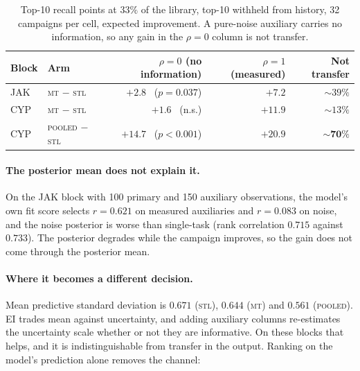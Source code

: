 \documentclass[11pt]{article}
\newcommand{\stl}{\textsc{stl}}
\newcommand{\mt}{\textsc{mt}}
\newcommand{\pooled}{\textsc{pooled}}
\begin{document}
\begin{table}[ht]
\centering\small
\begin{tabular}{llrrr}
\toprule
Block & Arm & $\rho = 0$ (no information) & $\rho = 1$ (measured) & Not transfer \\
\midrule
JAK & \mt{} $-$ \stl{}     & $+2.8$ \ ($p = 0.037$) & $+7.2$  & ${\sim}39\%$ \\
CYP & \mt{} $-$ \stl{}     & $+1.6$ \ (n.s.)        & $+11.9$ & ${\sim}13\%$ \\
CYP & \pooled{} $-$ \stl{} & $\mathbf{+14.7}$ \ ($p < 0.001$) & $+20.9$ & $\mathbf{{\sim}70\%}$ \\
\bottomrule
\end{tabular}
\caption{Top-10 recall points at $33\%$ of the library, top-10 withheld from
history, 32 campaigns per cell, expected improvement. A pure-noise auxiliary
carries no information, so any gain in the $\rho = 0$ column is not transfer.}
\label{tab:null}
\end{table}

\paragraph{The posterior mean does not explain it.} On the JAK block with 100 primary
and 150 auxiliary observations, the model's own fit score selects $r = 0.621$ on
measured auxiliaries and $r = 0.083$ on noise, and the noise posterior is worse
than single-task (rank correlation $0.715$ against $0.733$). The posterior degrades
while the campaign improves, so the gain does not come through the posterior
mean.

\paragraph{Where it becomes a different decision.} Mean predictive standard deviation is
$0.671$ (\stl{}), $0.644$ (\mt{}) and $0.561$ (\pooled{}). EI trades mean
against uncertainty, and adding auxiliary columns re-estimates the uncertainty
scale whether or not they are informative. On these blocks
that helps, and it is indistinguishable from transfer in the output. Ranking on
the model's prediction alone removes the channel:
\end{document}
